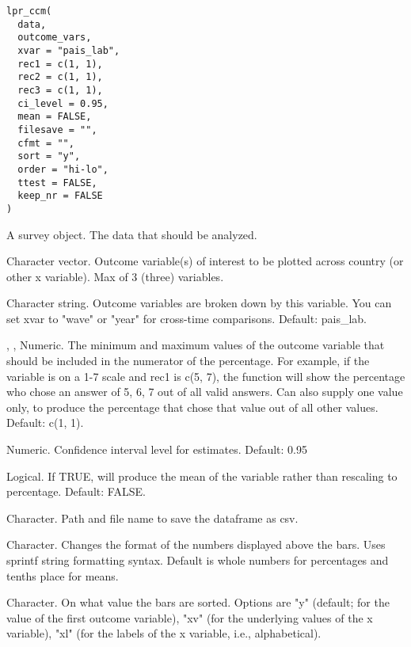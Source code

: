 \documentclass[a4paper]{book}
\begin{document}
%
\begin{Usage}
\begin{verbatim}
lpr_ccm(
  data,
  outcome_vars,
  xvar = "pais_lab",
  rec1 = c(1, 1),
  rec2 = c(1, 1),
  rec3 = c(1, 1),
  ci_level = 0.95,
  mean = FALSE,
  filesave = "",
  cfmt = "",
  sort = "y",
  order = "hi-lo",
  ttest = FALSE,
  keep_nr = FALSE
)
\end{verbatim}
\end{Usage}
%
\begin{Arguments}
\begin{ldescription}
\item[\code{data}] A survey object.  The data that should be analyzed.

\item[\code{outcome\_vars}] Character vector.  Outcome variable(s) of interest to be plotted
across country (or other x variable). Max of 3 (three) variables.

\item[\code{xvar}] Character string. Outcome variables are broken down by this variable. You can set
xvar to "wave" or "year" for cross-time comparisons. Default: pais\_lab.

\item[\code{rec1}, \code{rec2}, \code{rec3}] Numeric. The minimum and maximum values of the outcome variable that
should be included in the numerator of the percentage.  For example, if the variable
is on a 1-7 scale and rec1 is c(5, 7), the function will show the percentage who chose
an answer of 5, 6, 7 out of all valid answers.  Can also supply one value only,
to produce the percentage that chose that value out of all other values.
Default: c(1, 1).

\item[\code{ci\_level}] Numeric. Confidence interval level for estimates.  Default: 0.95

\item[\code{mean}] Logical.  If TRUE, will produce the mean of the variable rather than
rescaling to percentage.  Default: FALSE.

\item[\code{filesave}] Character.  Path and file name to save the dataframe as csv.

\item[\code{cfmt}] Character. Changes the format of the numbers displayed above the bars.
Uses sprintf string formatting syntax. Default is whole numbers for percentages
and tenths place for means.

\item[\code{sort}] Character. On what value the bars are sorted.
Options are "y" (default; for the value of the first outcome variable), "xv" (for
the underlying values of the x variable), "xl" (for the labels of the x variable,
i.e., alphabetical).


\end{ldescription}
\end{Arguments}
\end{document}
